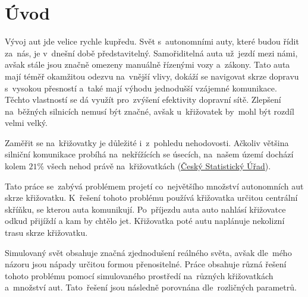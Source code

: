 \chapter*{Úvod}

Vývoj aut jde velice rychle kupředu.
Svět s~autonomními auty, které budou řídit za~nás, je v~dnešní době představitelný.
Samořiditelná auta už~jezdí mezi námi, avšak stále jsou značně omezeny manuálně řízenými vozy a~zákony.
Tato auta mají téměř okamžitou odezvu na~vnější vlivy, dokáží se navigovat skrze dopravu s~vysokou přesností a~také mají výhodu jednodušší vzájemné komunikace.
Těchto vlastností se dá využít pro~zvýšení efektivity dopravní sítě.
Zlepšení na~běžných silnicích nemusí být značné, avšak u~křižovatek by~mohl být rozdíl velmi velký.

Zaměřit se na~křižovatky je důležité i~z~pohledu nehodovosti.
Ačkoliv většina silniční komunikace probíhá na~nekřížících se úsecích, na~našem území dochází kolem $21\%$ všech nehod
právě na~křižovatkách (\href{https://www.czso.cz/documents/10180/20534694/32025414a06.pdf}{Český Statistický Úřad}).

Tato práce se~zabývá problémem projetí co~největšího množství autonomních aut skrze křižovatku.
K~řešení tohoto problému používá křižovatka určitou centrální skříňku, se kterou auta komunikují.
Po~příjezdu auta auto nahlásí křižovatce odkud přijíždí a kam by chtělo jet.
Křižovatka poté autu naplánuje nekolizní trasu skrze křižovatku.

Simulovaný svět obsahuje značná zjednodušení reálného světa, avšak dle~mého názoru jsou nápady určitou formou přenositelné.
Práce obsahuje různá řešení tohoto problému pomocí simulovaného prostředí na~různých křižovatkách a~množství aut.
Tato~řešení jsou následně porovnána dle~rozličných parametrů.


